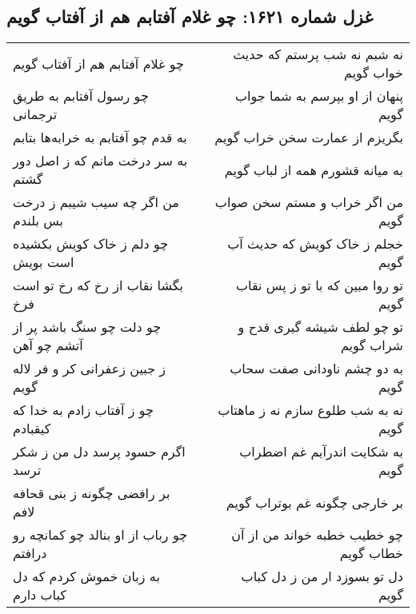 \begin{center}
\section*{غزل شماره ۱۶۲۱: چو غلام آفتابم هم از آفتاب گویم}
\label{sec:1621}
\begin{longtable}{l p{0.5cm} r}
چو غلام آفتابم هم از آفتاب گویم
&&
نه شبم نه شب پرستم که حدیث خواب گویم
\\
چو رسول آفتابم به طریق ترجمانی
&&
پنهان از او بپرسم به شما جواب گویم
\\
به قدم چو آفتابم به خرابه‌ها بتابم
&&
بگریزم از عمارت سخن خراب گویم
\\
به سر درخت مانم که ز اصل دور گشتم
&&
به میانه قشورم همه از لباب گویم
\\
من اگر چه سیب شیبم ز درخت بس بلندم
&&
من اگر خراب و مستم سخن صواب گویم
\\
چو دلم ز خاک کویش بکشیده است بویش
&&
خجلم ز خاک کویش که حدیث آب گویم
\\
بگشا نقاب از رخ که رخ تو است فرخ
&&
تو روا مبین که با تو ز پس نقاب گویم
\\
چو دلت چو سنگ باشد پر از آتشم چو آهن
&&
تو چو لطف شیشه گیری قدح و شراب گویم
\\
ز جبین زعفرانی کر و فر لاله گویم
&&
به دو چشم ناودانی صفت سحاب گویم
\\
چو ز آفتاب زادم به خدا که کیقبادم
&&
نه به شب طلوع سازم نه ز ماهتاب گویم
\\
اگرم حسود پرسد دل من ز شکر ترسد
&&
به شکایت اندرآیم غم اضطراب گویم
\\
بر رافضی چگونه ز بنی قحافه لافم
&&
بر خارجی چگونه غم بوتراب گویم
\\
چو رباب از او بنالد چو کمانچه رو درافتم
&&
چو خطیب خطبه خواند من از آن خطاب گویم
\\
به زبان خموش کردم که دل کباب دارم
&&
دل تو بسوزد ار من ز دل کباب گویم
\\
\end{longtable}
\end{center}
